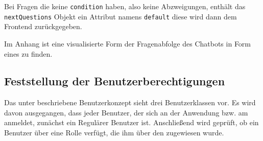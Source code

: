 Bei Fragen die keine \verb|condition| haben, also keine Abzweigungen, enthält das \verb|nextQuestions| Objekt ein Attribut namens \verb|default| diese wird dann dem Frontend zurückgegeben.

Im Anhang ist eine visualisierte Form der Fragenabfolge des Chatbots in Form eines  zu finden.  

\subsection{Feststellung der Benutzerberechtigungen}
\label{sec:Planungsphase:Benutzerberechtigungen}

Das unter  beschriebene Benutzerkonzept sieht drei Benutzerklassen vor. Es wird davon ausgegangen, dass jeder Benutzer, der sich an der Anwendung bzw. am  anmeldet, zunächst ein Regulärer Benutzer ist. Anschließend wird geprüft, ob ein Benutzer über eine Rolle verfügt, die ihm über den  zugewiesen wurde.
